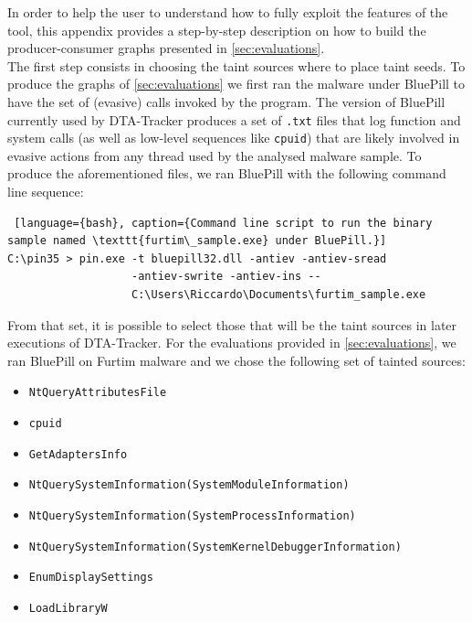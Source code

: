 \documentclass[LaM,binding=0.6cm]{sapthesis}
\begin{document}
In order to help the user to understand how to fully exploit the features of the tool, this appendix provides a step-by-step description on how to build the producer-consumer graphs presented in \autoref{sec:evaluations}.\\

The first step consists in choosing the taint sources where to place taint seeds. To produce the graphs of \autoref{sec:evaluations} we first ran the malware under BluePill to have the set of (evasive) calls invoked by the program. The version of BluePill currently used by {\sf DTA-Tracker} produces a set of \texttt{.txt} files that log function and system calls (as well as low-level sequences like {\tt cpuid}) that are likely involved in evasive actions from any thread used by the analysed malware sample. To produce the aforementioned files, we ran BluePill with the following command line sequence:
\begin{lstlisting} [language={bash}, caption={Command line script to run the binary sample named \texttt{furtim\_sample.exe} under BluePill.}]
C:\pin35 > pin.exe -t bluepill32.dll -antiev -antiev-sread 
				   -antiev-swrite -antiev-ins -- 
				   C:\Users\Riccardo\Documents\furtim_sample.exe
\end{lstlisting}

\noindent
From that set, it is possible to select those that will be the taint sources in later executions of {\sf DTA-Tracker}. For the evaluations provided in \autoref{sec:evaluations}, we ran BluePill on Furtim malware and we chose the following set of tainted sources:
\begin{itemize}
\item \texttt{NtQueryAttributesFile}
\item \texttt{cpuid}
\item \texttt{GetAdaptersInfo}
\item \texttt{NtQuerySystemInformation(SystemModuleInformation)}
\item \texttt{NtQuerySystemInformation(SystemProc\-essInformation)}
\item \texttt{NtQuerySystemInformation(SystemKernelDebuggerInformation)}
\item \texttt{EnumDisplaySettings}
\item \texttt{LoadLibraryW}
\end{itemize}
\end{document}
